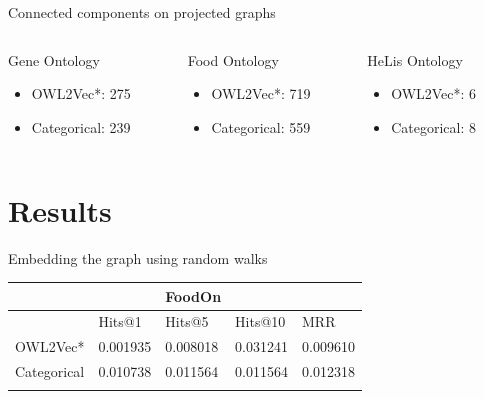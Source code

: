 \documentclass[bigger]{beamer}
\begin{document}
\begin{frame}[label={sec:org34e5cf6}]{Connected components on projected graphs}
\begin{columns}
\begin{column}{0.33\columnwidth}
\alert{Gene Ontology}

\begin{itemize}
\item OWL2Vec*: 275
\item Categorical: 239
\end{itemize}
\end{column}

\begin{column}{0.33\columnwidth}
\alert{Food Ontology}

\begin{itemize}
\item OWL2Vec*: 719
\item Categorical: 559
\end{itemize}
\end{column}

\begin{column}{0.33\columnwidth}
\alert{HeLis Ontology}
\begin{itemize}
\item OWL2Vec*: 6
\item Categorical: 8
\end{itemize}
\end{column}
\end{columns}
\end{frame}


\section{Results}
\label{sec:org38f6c8d}

\begin{frame}[label={sec:org5706012}]{Embedding the graph using random walks}
\begin{center}
\begin{tabular}{lllll}
 &  & FoodOn &  & \\
\hline
 & Hits@1 & Hits@5 & Hits@10 & MRR\\
\hline
OWL2Vec* & 0.001935 & 0.008018 & \alert{0.031241} & 0.009610\\
Categorical & \alert{0.010738} & \alert{0.011564} & 0.011564 & \alert{0.012318}\\
 &  &  &  & \\
\end{tabular}
\end{center}
\end{frame}
\end{document}
